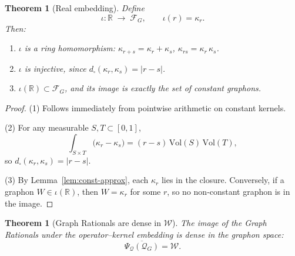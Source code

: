 \documentclass[11pt]{article}
\theoremstyle{definition}
\theoremstyle{plain}
\newtheorem{theorem}[definition]{Theorem}
\theoremstyle{remark}
\begin{document}
\begin{theorem}[Real embedding]\label{thm:real-embed}
Define
\[
  \iota:\mathbb{R}\;\longrightarrow\;\mathcal{F}_G,
  \qquad
  \iota(r)=\kappa_r.
\]
Then:
\begin{enumerate}
  \item $\iota$ is a ring homomorphism:
        $\kappa_{r+s}=\kappa_r+\kappa_s$,
        $\kappa_{rs}=\kappa_r\,\kappa_s$.
  \item $\iota$ is injective, since
        $d_\square(\kappa_r,\kappa_s)=|r-s|$.
  \item $\iota(\mathbb{R})\subset\mathcal{F}_G$, and its image is exactly the set of constant graphons.
\end{enumerate}
\end{theorem}

\begin{proof}

\vspace{0.5em}

\noindent
(1) Follows immediately from pointwise arithmetic on constant kernels.  

\vspace{0.5em}

\noindent
(2) For any measurable $S,T\subset[0,1]$,
\[
  \int_{S\times T}\bigl(\kappa_r-\kappa_s\bigr)
  = (r-s)\,\mathrm{Vol}(S)\,\mathrm{Vol}(T),
\]
so $d_\square(\kappa_r,\kappa_s)=|r-s|$.  

\vspace{0.5em}

\noindent
(3) By Lemma~\ref{lem:const-approx}, each $\kappa_r$ lies in the closure.  Conversely, if a graphon $W\in\iota(\mathbb{R})$, then $W=\kappa_r$ for some $r$, so no non‐constant graphon is in the image.
\end{proof}

\begin{theorem}[Graph Rationals are dense in \(\mathcal{W}\)]
\label{lem:qr-dense}
The image of the Graph Rationals under the operator–kernel embedding is dense in the graphon space:
\[
  \overline{\Psi_{\mathcal Q}(\mathcal Q_G)} = \mathcal{W}.
\]
\end{theorem}
\end{document}
